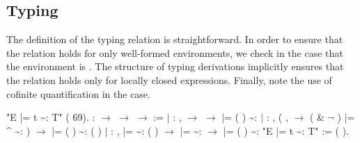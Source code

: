 \documentclass[12pt]{report}
\begin{document}
\subsection{Typing}



 The definition of the typing relation is straightforward.  In
    order to ensure that the relation holds for only well-formed
    environments, we check in the  case that the
    environment is .  The structure of typing derivations
    implicitly ensures that the relation holds only for locally closed
    expressions.  Finally, note the use of cofinite quantification in
    the  case. 
\begin{coqdoccode}
\coqdocemptyline
\coqdocnoindent
{} "E |= t \~{}: T" (  69).\coqdoceol
\coqdocemptyline
\coqdocnoindent
{}  :  \ensuremath{\rightarrow}  \ensuremath{\rightarrow}  \ensuremath{\rightarrow}  :=\coqdoceol
\coqdocindent{1.00em}
\ensuremath{|}  : \coqdockw{\ensuremath{\forall}}   ,\coqdoceol
\coqdocindent{3.00em}
  \ensuremath{\rightarrow}\coqdoceol
\coqdocindent{3.00em}
    \ensuremath{\rightarrow}\coqdoceol
\coqdocindent{3.00em}
 |= ( ) \~{}: \coqdoceol
\coqdocindent{1.00em}
\ensuremath{|}  : \coqdockw{\ensuremath{\forall}}     ,\coqdoceol
\coqdocindent{3.00em}
(\coqdockw{\ensuremath{\forall}} ,    \ensuremath{\rightarrow} \coqdoceol
\coqdocindent{4.00em}
( \&  \ensuremath{\lnot} ) |=  \^{}  \~{}: ) \ensuremath{\rightarrow}\coqdoceol
\coqdocindent{3.00em}
 |= ( ) \~{}: (  )\coqdoceol
\coqdocindent{1.00em}
\ensuremath{|}  : \coqdockw{\ensuremath{\forall}}     ,\coqdoceol
\coqdocindent{3.00em}
 |=  \~{}: (  ) \ensuremath{\rightarrow} \coqdoceol
\coqdocindent{3.00em}
 |=  \~{}:  \ensuremath{\rightarrow}\coqdoceol
\coqdocindent{3.00em}
 |= (  ) \~{}: \coqdoceol
\coqdocnoindent
\coqdoceol
\coqdocnoindent
{} "E |= t \~{}: T" := (   ).\coqdoceol
\coqdocemptyline
\end{coqdoccode}
\end{document}
